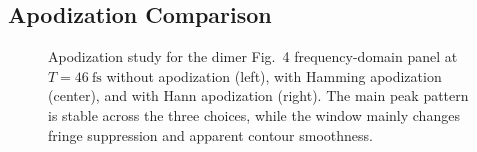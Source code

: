 \subsection{Apodization Comparison}

\begin{figure}[p]
    \centering
    \begin{minipage}[t]{0.32\linewidth}
        \centering
        \safeplaceholdergraphic[0.98\linewidth]{\dimerFigFourWaitFortySixPaperApodBaselinePath}
    \end{minipage}\hfill
    \begin{minipage}[t]{0.32\linewidth}
        \centering
        \safeplaceholdergraphic[0.98\linewidth]{\dimerFigFourWaitFortySixPaperApodHammingPath}
    \end{minipage}\hfill
    \begin{minipage}[t]{0.32\linewidth}
        \centering
        \safeplaceholdergraphic[0.98\linewidth]{\dimerFigFourWaitFortySixPaperApodHannPath}
    \end{minipage}
    \caption{Apodization study for the dimer Fig.~4 frequency-domain panel at $T=\SI{46}{\femto\second}$ without apodization (left), with Hamming apodization (center), and with Hann apodization (right). The main peak pattern is stable across the three choices, while the window mainly changes fringe suppression and apparent contour smoothness.}
    \label{fig:app_dimer_fig4_t46_apodization}
\end{figure}
